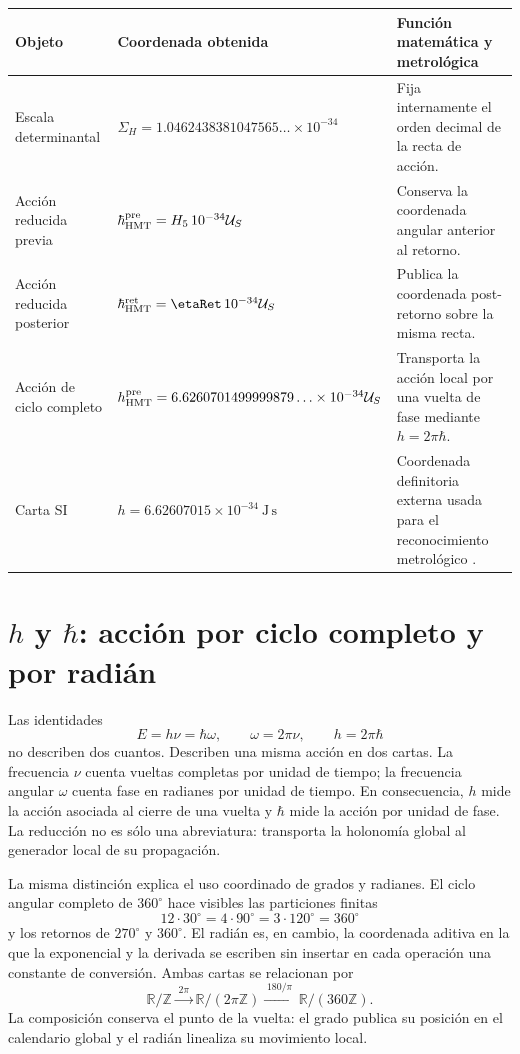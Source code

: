 \begin{center}
\begin{tabularx}{0.96\textwidth}{@{}L{0.22\textwidth}L{0.36\textwidth}Y@{}}
\toprule
Objeto & Coordenada obtenida & Función matemática y metrológica\\
\midrule
Escala determinantal &
\(\Sigma_H=1.0462438381047565\ldots\times10^{-34}\) &
Fija internamente el orden decimal de la recta de acción.\\
Acción reducida previa &
\(\hbar_{\rm HMT}^{\rm pre}=H_5\,10^{-34}\mathcal U_S\) &
Conserva la coordenada angular anterior al retorno.\\
Acción reducida posterior &
\(\hbar_{\rm HMT}^{\rm ret}=\etaRet\,10^{-34}\mathcal U_S\) &
Publica la coordenada post-retorno sobre la misma recta.\\
Acción de ciclo completo &
\(h_{\rm HMT}^{\rm pre}=6.6260701499999879\ldots\times10^{-34}\mathcal U_S\) &
Transporta la acción local por una vuelta de fase mediante \(h=2\pi\hbar\).\\
Carta SI &
\(h=6.62607015\times10^{-34}\ \mathrm{J\,s}\) &
Coordenada definitoria externa usada para el reconocimiento metrológico
\cite{BIPMSI}.\\
\bottomrule
\end{tabularx}
\end{center}

\section{\texorpdfstring{\(h\)}{h} y
\texorpdfstring{\(\hbar\)}{h barra}: acción por ciclo completo y por radián}
\label{sec:accion-vuelta-radian-rev6}

Las identidades
\[
 E=h\nu=\hbar\omega,\qquad
 \omega=2\pi\nu,\qquad
 h=2\pi\hbar
\]
no describen dos cuantos. Describen una misma acción en dos cartas. La
frecuencia \(\nu\) cuenta vueltas completas por unidad de tiempo; la
frecuencia angular \(\omega\) cuenta fase en radianes por unidad de tiempo.
En consecuencia, \(h\) mide la acción asociada al cierre de una vuelta y
\(\hbar\) mide la acción por unidad de fase. La reducción no es sólo una
abreviatura: transporta la holonomía global al generador local de su
propagación.

La misma distinción explica el uso coordinado de grados y radianes. El ciclo
angular completo de \(360^\circ\) hace visibles las particiones finitas
\[
 12\cdot30^\circ=4\cdot90^\circ
 =3\cdot120^\circ=360^\circ
\]
y los retornos de \(270^\circ\) y \(360^\circ\). El radián es, en cambio,
la coordenada aditiva en la que la exponencial y la derivada se escriben sin
insertar en cada operación una constante de conversión. Ambas cartas se
relacionan por
\[
 \mathbb R/\mathbb Z
 \xrightarrow{\;2\pi\;}
 \mathbb R/(2\pi\mathbb Z)
 \xrightarrow{\;180/\pi\;}
 \mathbb R/(360\mathbb Z).
\]
La composición conserva el punto de la vuelta: el grado publica su posición
en el calendario global y el radián linealiza su movimiento local.

